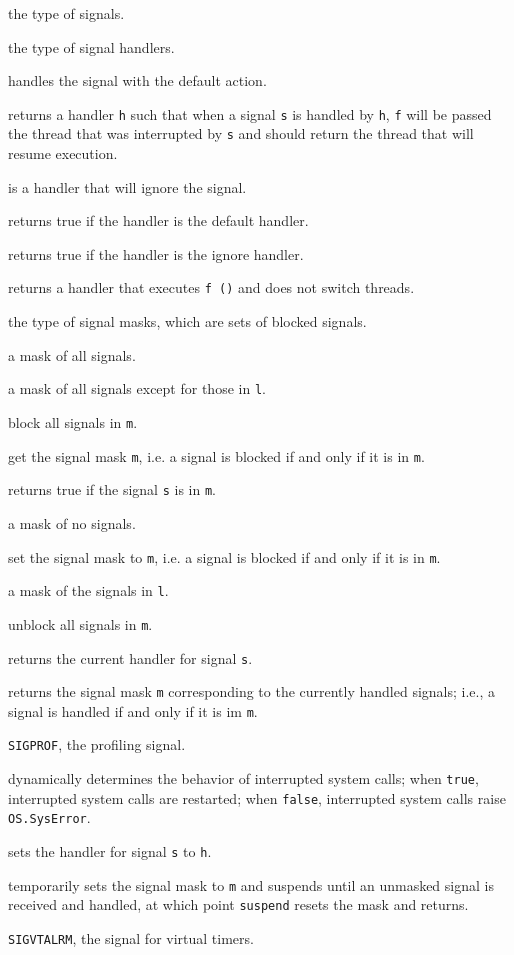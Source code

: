 \begin{description}

 the type of signals.

the type of signal handlers.

handles the signal with the default action.

returns a handler {\tt h} such that when a signal {\tt s} is handled
by {\tt h}, {\tt f} will be passed the thread that was interrupted by
{\tt s} and should return the thread that will resume execution.

is a handler that will ignore the signal.

returns true if the handler is the default handler.

returns true if the handler is the ignore handler.

returns a handler that executes {\tt f ()} and does not switch
threads.

the type of signal masks, which are sets of blocked signals.

a mask of all signals.

a mask of all signals except for those in {\tt l}.

block all signals in {\tt m}.

get the signal mask {\tt m}, i.e. a signal is blocked if and only
if it is in {\tt m}.

returns true if the signal {\tt s} is in {\tt m}.

a mask of no signals.

set the signal mask to {\tt m}, i.e. a signal is blocked if and only
if it is in {\tt m}.

a mask of the signals in {\tt l}.

unblock all signals in {\tt m}.

returns the current handler for signal {\tt s}.

returns the signal mask {\tt m} corresponding to the currently handled
signals; i.e., a signal is handled if and only if it is im {\tt m}.

{\tt SIGPROF}, the profiling signal.

dynamically determines the behavior of interrupted system calls; when
{\tt true}, interrupted system calls are restarted; when {\tt false},
interrupted system calls raise {\tt OS.SysError}.

sets the handler for signal {\tt s} to {\tt h}.

temporarily sets the signal mask to {\tt m} and suspends until an
unmasked signal is received and handled, at which point {\tt suspend} resets
the mask and returns.

{\tt SIGVTALRM}, the signal for virtual timers.
\end{description}
%
